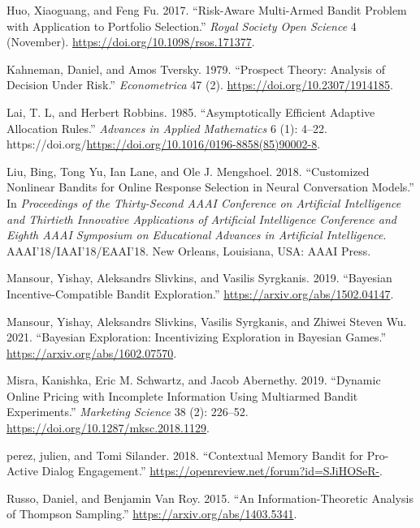 \documentclass[
  letterpaper,
  numbers=noenddot,
  DIV=11]{scrreprt}
\newlength{\cslhangindent}
\newenvironment{CSLReferences}[2] %
 {\begin{list}{}{%
  \setlength{\itemindent}{0pt}
  \setlength{\leftmargin}{0pt}
  \setlength{\parsep}{0pt}
  \ifodd #1
   \setlength{\leftmargin}{\cslhangindent}
   \setlength{\itemindent}{-1\cslhangindent}
  \fi
  \setlength{\itemsep}{#2\baselineskip}}}
 {\end{list}}
\theoremstyle{plain}
\theoremstyle{definition}
\theoremstyle{plain}
\theoremstyle{remark}
\begin{document}
\begin{CSLReferences}{1}{0}
Huo, Xiaoguang, and Feng Fu. 2017. {``Risk-Aware Multi-Armed Bandit
Problem with Application to Portfolio Selection.''} \emph{Royal Society
Open Science} 4 (November). \url{https://doi.org/10.1098/rsos.171377}.

Kahneman, Daniel, and Amos Tversky. 1979. {``Prospect Theory: Analysis
of Decision Under Risk.''} \emph{Econometrica} 47 (2).
\url{https://doi.org/10.2307/1914185}.

Lai, T. L, and Herbert Robbins. 1985. {``Asymptotically Efficient
Adaptive Allocation Rules.''} \emph{Advances in Applied Mathematics} 6
(1): 4--22.
https://doi.org/\url{https://doi.org/10.1016/0196-8858(85)90002-8}.

Liu, Bing, Tong Yu, Ian Lane, and Ole J. Mengshoel. 2018. {``Customized
Nonlinear Bandits for Online Response Selection in Neural Conversation
Models.''} In \emph{Proceedings of the Thirty-Second AAAI Conference on
Artificial Intelligence and Thirtieth Innovative Applications of
Artificial Intelligence Conference and Eighth AAAI Symposium on
Educational Advances in Artificial Intelligence}.
AAAI'18/IAAI'18/EAAI'18. New Orleans, Louisiana, USA: AAAI Press.

Mansour, Yishay, Aleksandrs Slivkins, and Vasilis Syrgkanis. 2019.
{``Bayesian Incentive-Compatible Bandit Exploration.''}
\url{https://arxiv.org/abs/1502.04147}.

Mansour, Yishay, Aleksandrs Slivkins, Vasilis Syrgkanis, and Zhiwei
Steven Wu. 2021. {``Bayesian Exploration: Incentivizing Exploration in
Bayesian Games.''} \url{https://arxiv.org/abs/1602.07570}.

Misra, Kanishka, Eric M. Schwartz, and Jacob Abernethy. 2019. {``Dynamic
Online Pricing with Incomplete Information Using Multiarmed Bandit
Experiments.''} \emph{Marketing Science} 38 (2): 226--52.
\url{https://doi.org/10.1287/mksc.2018.1129}.

perez, julien, and Tomi Silander. 2018. {``Contextual Memory Bandit for
Pro-Active Dialog Engagement.''}
\url{https://openreview.net/forum?id=SJiHOSeR-}.

Russo, Daniel, and Benjamin Van Roy. 2015. {``An Information-Theoretic
Analysis of Thompson Sampling.''} \url{https://arxiv.org/abs/1403.5341}.


\end{CSLReferences}
\end{document}

